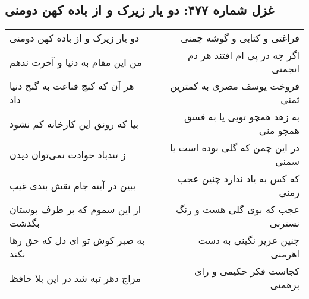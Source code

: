 \begin{center}
\section*{غزل شماره ۴۷۷: دو یار زیرک و از باده کهن دومنی}
\label{sec:sh477}
\begin{longtable}{l p{0.5cm} r}
دو یار زیرک و از باده کهن دومنی
&&
فراغتی و کتابی و گوشه چمنی
\\
من این مقام به دنیا و آخرت ندهم
&&
اگر چه در پی ام افتند هر دم انجمنی
\\
هر آن که کنج قناعت به گنج دنیا داد
&&
فروخت یوسف مصری به کمترین ثمنی
\\
بیا که رونق این کارخانه کم نشود
&&
به زهد همچو تویی یا به فسق همچو منی
\\
ز تندباد حوادث نمی‌توان دیدن
&&
در این چمن که گلی بوده است یا سمنی
\\
ببین در آینه جام نقش بندی غیب
&&
که کس به یاد ندارد چنین عجب زمنی
\\
از این سموم که بر طرف بوستان بگذشت
&&
عجب که بوی گلی هست و رنگ نسترنی
\\
به صبر کوش تو ای دل که حق رها نکند
&&
چنین عزیز نگینی به دست اهرمنی
\\
مزاج دهر تبه شد در این بلا حافظ
&&
کجاست فکر حکیمی و رای برهمنی
\\
\end{longtable}
\end{center}
